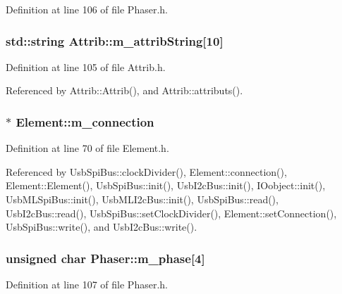 Definition at line 106 of file Phaser.h.\hypertarget{classAttrib_a3414521d7a82476e874b25a5407b5e63}{
\subsubsection[{m\_\-attribString}]{\setlength{\rightskip}{0pt plus 5cm}std::string {\bf Attrib::m\_\-attribString}\mbox{[}10\mbox{]}}}
\label{classAttrib_a3414521d7a82476e874b25a5407b5e63}


Definition at line 105 of file Attrib.h.

Referenced by Attrib::Attrib(), and Attrib::attributs().\hypertarget{classElement_abe3de7a5dbbc9a6dd2d7e012e5fdb266}{
\subsubsection[{m\_\-connection}]{$\ast$ {\bf Element::m\_\-connection}}}
\label{classElement_abe3de7a5dbbc9a6dd2d7e012e5fdb266}


Definition at line 70 of file Element.h.

Referenced by UsbSpiBus::clockDivider(), Element::connection(), Element::Element(), UsbSpiBus::init(), UsbI2cBus::init(), IOobject::init(), UsbMLSpiBus::init(), UsbMLI2cBus::init(), UsbSpiBus::read(), UsbI2cBus::read(), UsbSpiBus::setClockDivider(), Element::setConnection(), UsbSpiBus::write(), and UsbI2cBus::write().\hypertarget{classPhaser_a04df9ce4afe7a36ccaba5e5e727d504e}{
\subsubsection[{m\_\-phase}]{\setlength{\rightskip}{0pt plus 5cm}unsigned char {\bf Phaser::m\_\-phase}\mbox{[}4\mbox{]}}}
\label{classPhaser_a04df9ce4afe7a36ccaba5e5e727d504e}


Definition at line 107 of file Phaser.h.

